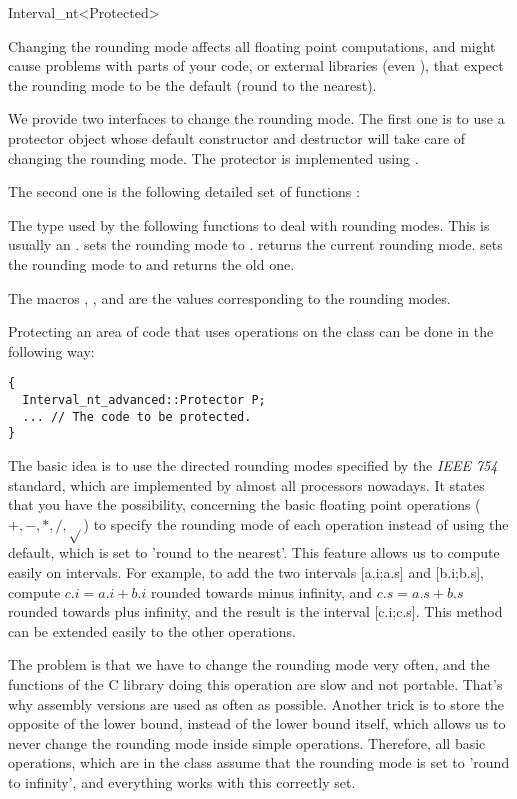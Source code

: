\begin{ccRefClass}{Interval_nt<Protected>}
\begin{ccAdvanced}
Changing the rounding mode affects all floating point computations, and might
cause problems with parts of your code, or external libraries (even \cgal),
that expect the rounding mode to be the default (round to the nearest).

We provide two interfaces to change the rounding mode.  The first one is to
use a protector object whose default constructor and destructor will take care
of changing the rounding mode.  The protector is implemented using
.

The second one is the following detailed set of functions :

       {The type used by the following functions to deal with rounding modes.
       This is usually an .}
       {sets the rounding mode to .}
       {returns the current rounding mode.}
       {sets the rounding mode to  and returns the old one. }

The macros , ,
 and  are the values corresponding
to the rounding modes.

\ccExample

Protecting an area of code that uses operations on the class
 can be done in the following way:

\begin{verbatim}
{
  Interval_nt_advanced::Protector P;
  ... // The code to be protected.
}
\end{verbatim}

The basic idea is to use the directed rounding modes specified by the 
{\it IEEE 754} standard, which are implemented by almost all processors 
nowadays.
It states that you have the possibility, concerning the basic floating point
operations ($+,-,*,/,\sqrt{}$) to specify the rounding mode of each operation
instead of using the default, which is set to 'round to the nearest'.
This feature allows us to compute easily on intervals.  For example, to
add the two intervals [a.i;a.s] and [b.i;b.s], compute $c.i=a.i+b.i$ rounded
towards minus infinity, and $c.s=a.s+b.s$ rounded towards plus infinity, and
the result is the interval [c.i;c.s].  This method can be extended easily to
the other operations.

The problem is that we have to change the rounding mode very often, and the
functions of the C library doing this operation are slow and not portable.
That's why assembly versions are used as often as possible.
Another trick is to store the opposite of the lower bound, instead of the
lower bound itself, which allows us to never change the rounding mode inside
simple operations.  Therefore, all basic operations, which are in the class 
 assume that the rounding mode is set to 
'round to infinity', and everything works with this correctly set.  


\end{ccAdvanced}
\end{ccRefClass}
